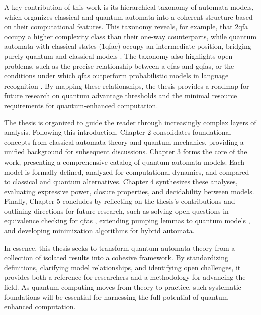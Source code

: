 A key contribution of this work is its hierarchical taxonomy of automata models, which organizes classical and quantum automata into a coherent structure based on their computational features. This taxonomy reveals, for example, that \gls{2qfa} occupy a higher complexity class than their one-way counterparts, while quantum automata with classical states (\gls{1qfac}) occupy an intermediate position, bridging purely quantum and classical models \cite{yakaryilmaz2010succinctness}. The taxonomy also highlights open problems, such as the precise relationship between \glspl{a-qfa} and \glspl{gqfa}, or the conditions under which \glspl{qfa} outperform probabilistic models in language recognition \cite{hirvensalo2012quantum}. By mapping these relationships, the thesis provides a roadmap for future research on quantum advantage thresholds and the minimal resource requirements for quantum-enhanced computation.  

The thesis is organized to guide the reader through increasingly complex layers of analysis. Following this introduction, Chapter 2 consolidates foundational concepts from classical automata theory and quantum mechanics, providing a unified background for subsequent discussions. Chapter 3 forms the core of the work, presenting a comprehensive catalog of quantum automata models. Each model is formally defined, analyzed for computational dynamics, and compared to classical and quantum alternatives. Chapter 4 synthesizes these analyses, evaluating expressive power, closure properties, and decidability between models. Finally, Chapter 5 concludes by reflecting on the thesis’s contributions and outlining directions for future research, such as solving open questions in equivalence checking for \glspl{qfa} \cite{li2012characterizations}, extending pumping lemmas to quantum models \cite{ambainis1998one}, and developing minimization algorithms for hybrid automata.  

In essence, this thesis seeks to transform quantum automata theory from a collection of isolated results into a cohesive framework. By standardizing definitions, clarifying model relationships, and identifying open challenges, it provides both a reference for researchers and a methodology for advancing the field. As quantum computing moves from theory to practice, such systematic foundations will be essential for harnessing the full potential of quantum-enhanced computation.